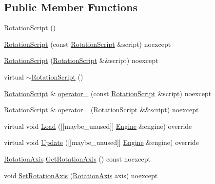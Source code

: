 \subsection*{Public Member Functions}
\begin{DoxyCompactItemize}
\item 
\hyperlink{classmage_1_1script_1_1_rotation_script_a2961e96c890f5b737fa1851a4f6434fe}{Rotation\+Script} ()
\item 
\hyperlink{classmage_1_1script_1_1_rotation_script_adac08b8383fabba67df915f03a2a01ee}{Rotation\+Script} (const \hyperlink{classmage_1_1script_1_1_rotation_script}{Rotation\+Script} \&script) noexcept
\item 
\hyperlink{classmage_1_1script_1_1_rotation_script_a56942de038a4899fa2fb3d9199f18052}{Rotation\+Script} (\hyperlink{classmage_1_1script_1_1_rotation_script}{Rotation\+Script} \&\&script) noexcept
\item 
virtual \hyperlink{classmage_1_1script_1_1_rotation_script_a7deb74070c49b78b0b91e3599ee8a0b7}{$\sim$\+Rotation\+Script} ()
\item 
\hyperlink{classmage_1_1script_1_1_rotation_script}{Rotation\+Script} \& \hyperlink{classmage_1_1script_1_1_rotation_script_a9302878671d095bab0c31a379ad7d964}{operator=} (const \hyperlink{classmage_1_1script_1_1_rotation_script}{Rotation\+Script} \&script) noexcept
\item 
\hyperlink{classmage_1_1script_1_1_rotation_script}{Rotation\+Script} \& \hyperlink{classmage_1_1script_1_1_rotation_script_af75323393f7570b9fcee0cd62c4f76bd}{operator=} (\hyperlink{classmage_1_1script_1_1_rotation_script}{Rotation\+Script} \&\&script) noexcept
\item 
virtual void \hyperlink{classmage_1_1script_1_1_rotation_script_a7da4165e899facc981c0ee5b1f4a4453}{Load} (\mbox{[}\mbox{[}maybe\+\_\+unused\mbox{]}\mbox{]} \hyperlink{classmage_1_1_engine}{Engine} \&engine) override
\item 
virtual void \hyperlink{classmage_1_1script_1_1_rotation_script_af4e83590b78094186b0dd107a58c7b3a}{Update} (\mbox{[}\mbox{[}maybe\+\_\+unused\mbox{]}\mbox{]} \hyperlink{classmage_1_1_engine}{Engine} \&engine) override
\item 
\hyperlink{classmage_1_1script_1_1_rotation_script_a54e1d1d0af65f43f5bc5ad65a4b9c00a}{Rotation\+Axis} \hyperlink{classmage_1_1script_1_1_rotation_script_ac2ef46249d59b379f47336eb250f3a28}{Get\+Rotation\+Axis} () const noexcept
\item 
void \hyperlink{classmage_1_1script_1_1_rotation_script_aa4b49dc5e34da3e851d5aefc4c4a434b}{Set\+Rotation\+Axis} (\hyperlink{classmage_1_1script_1_1_rotation_script_a54e1d1d0af65f43f5bc5ad65a4b9c00a}{Rotation\+Axis} axis) noexcept
\end{DoxyCompactItemize}
